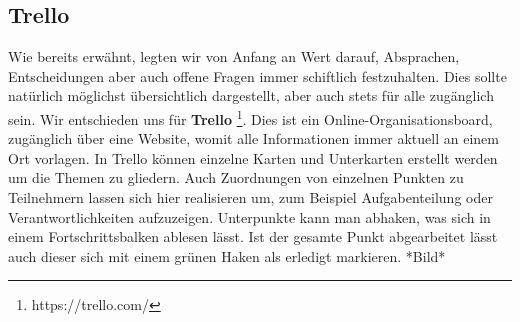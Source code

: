 \subsection{Trello}
Wie bereits erwähnt, legten wir von Anfang an Wert darauf, Absprachen, Entscheidungen aber auch offene Fragen immer schiftlich festzuhalten. Dies sollte natürlich möglichst übersichtlich dargestellt, aber auch stets für alle zugänglich sein. Wir entschieden uns für \textbf{Trello} \footnote[1]{https://trello.com/}. Dies ist ein Online-Organisationsboard, zugänglich über eine Website, womit alle Informationen immer aktuell an einem Ort vorlagen. In Trello können einzelne Karten und Unterkarten erstellt werden um die Themen zu gliedern. Auch Zuordnungen von einzelnen Punkten zu Teilnehmern lassen sich hier realisieren um, zum Beispiel Aufgabenteilung oder Verantwortlichkeiten aufzuzeigen. Unterpunkte kann man abhaken, was sich in einem Fortschrittsbalken ablesen lässt. Ist der gesamte Punkt abgearbeitet lässt auch dieser sich mit einem grünen Haken als erledigt markieren.
*Bild*